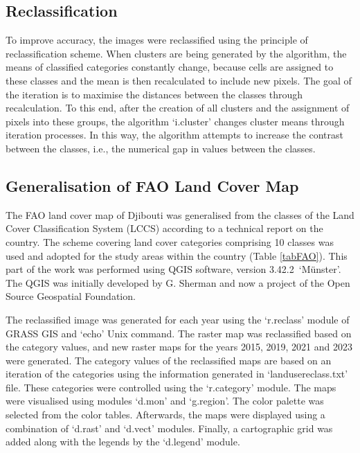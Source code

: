 \documentclass[jimaging,article,accept,pdftex,moreauthors]{Definitions/mdpi}
\begin{document}
{%
\subsection{Reclassification}

{To improve} accuracy, the images were reclassified using the principle of reclassification scheme. {When clusters are being generated by the algorithm, the means of classified categories constantly change, because cells are assigned to these classes and the mean is then recalculated to include new pixels. The goal of the iteration is to maximise the distances between the classes through recalculation. To this end, after the creation of all clusters and the assignment of pixels into these groups, the algorithm ‘i.cluster' changes cluster means through iteration processes. In this way, the algorithm attempts to increase the contrast between the classes, i.e., the numerical gap in values between the classes.}

\subsection{{Generalisation of FAO Land Cover Map}}

{The {FAO} land cover map of Djibouti was generalised from the classes of the Land Cover Classification System (LCCS) according to a technical report on the country. {The scheme covering land {cover} categories {comprising} 10 classes was used and adopted for the study areas within the country} %
(Table} \ref{tabFAO}). This part of the work was performed using QGIS software, version \mbox{3.42.2 ‘M\"unster'}. The QGIS was initially developed by G. Sherman and now a project of the Open Source Geospatial Foundation. 

{The reclassified }image was generated for each year using the ‘r.reclass’ module of GRASS GIS {and} ‘echo’ Unix command.{ }The raster map was reclassified based on the category values, and new raster maps for the years 2015, 2019, 2021 and 2023 were {generated}. The category values of the reclassified maps are based on an {iteration} of the categories using the information generated in ‘landusereclass.txt' file. {These} categories were {controlled} using the ‘r.category' module. The maps were{ }visualised using{ }modules {`d.mon' and ‘g.region'}.  The color palette was {selected from the} color tables. {Afterwards, the maps} were displayed using a combination of ‘d.rast’ and ‘d.vect’ {modules}. {Finally, }a cartographic grid was added {along with} the legends by the ‘d.legend’ module.


}
\end{document}
